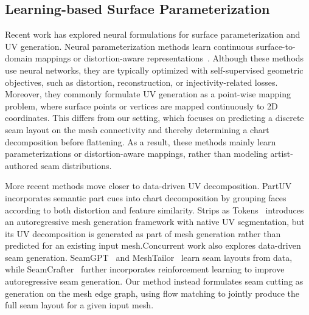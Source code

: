 \subsection{Learning-based Surface Parameterization}

Recent work has explored neural formulations for surface parameterization and UV generation.
Neural parameterization methods learn continuous surface-to-domain mappings or distortion-aware representations~\cite{groueix2018papier, morreale2021neural, zhao2024flexpara, srinivasan2024nuvo, zhang2024flatten, liu2024dawand}.
Although these methods use neural networks, they are typically optimized with self-supervised geometric objectives, such as distortion, reconstruction, or injectivity-related losses.
Moreover, they commonly formulate UV generation as a point-wise mapping problem, where surface points or vertices are mapped continuously to 2D coordinates.
This differs from our setting, which focuses on predicting a discrete seam layout on the mesh connectivity and thereby determining a chart decomposition before flattening.
As a result, these methods mainly learn parameterizations or distortion-aware mappings, rather than modeling artist-authored seam distributions.

More recent methods move closer to data-driven UV decomposition.
PartUV~\cite{wang2025partuv} incorporates semantic part cues into chart decomposition by grouping faces according to both distortion and feature similarity.
Strips as Tokens~\cite{xu2026strips} introduces an autoregressive mesh generation framework with native UV segmentation, but its UV decomposition is generated as part of mesh generation rather than predicted for an existing input mesh.Concurrent work also explores data-driven seam generation.
SeamGPT~\cite{li2025seamgpt} and MeshTailor~\cite{ma2026meshtailor} learn seam layouts from data, while SeamCrafter~\cite{liu2025seamcrafter} further incorporates reinforcement learning to improve autoregressive seam generation.
Our method instead formulates seam cutting as generation on the mesh edge graph, using flow matching to jointly produce the full seam layout for a given input mesh.


